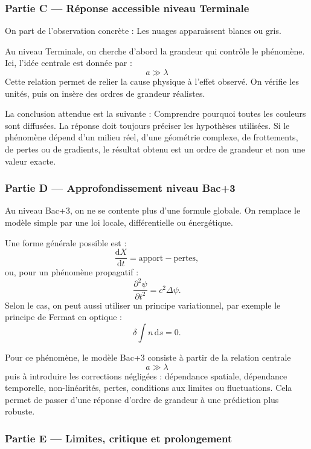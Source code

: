 \documentclass[11pt,a4paper]{article}
\begin{document}
\subsubsection*{Partie C — Réponse accessible niveau Terminale}

\begin{corrigebox}
On part de l'observation concrète : Les nuages apparaissent blancs ou gris.

Au niveau Terminale, on cherche d'abord la grandeur qui contrôle le phénomène. Ici, l'idée centrale est donnée par :
\[
a\gg\lambda
\]
Cette relation permet de relier la cause physique à l'effet observé. On vérifie les unités, puis on insère des ordres de grandeur réalistes.

La conclusion attendue est la suivante : Comprendre pourquoi toutes les couleurs sont diffusées. La réponse doit toujours préciser les hypothèses utilisées. Si le phénomène dépend d'un milieu réel, d'une géométrie complexe, de frottements, de pertes ou de gradients, le résultat obtenu est un ordre de grandeur et non une valeur exacte.
\end{corrigebox}

\subsubsection*{Partie D — Approfondissement niveau Bac+3}

\begin{approfondissementbox}
Au niveau Bac+3, on ne se contente plus d'une formule globale. On remplace le modèle simple par une loi locale, différentielle ou énergétique.

Une forme générale possible est :
\[
\frac{\mathrm d X}{\mathrm dt}=\text{apport}-\text{pertes},
\]
ou, pour un phénomène propagatif :
\[
\frac{\partial^2 \psi}{\partial t^2}=c^2\Delta\psi.
\]
Selon le cas, on peut aussi utiliser un principe variationnel, par exemple le principe de Fermat en optique :
\[
\delta \int n\,\mathrm ds=0.
\]

Pour ce phénomène, le modèle Bac+3 consiste à partir de la relation centrale
\[
a\gg\lambda
\]
puis à introduire les corrections négligées : dépendance spatiale, dépendance temporelle, non-linéarités, pertes, conditions aux limites ou fluctuations. Cela permet de passer d'une réponse d'ordre de grandeur à une prédiction plus robuste.
\end{approfondissementbox}

\subsubsection*{Partie E — Limites, critique et prolongement}
\end{document}
